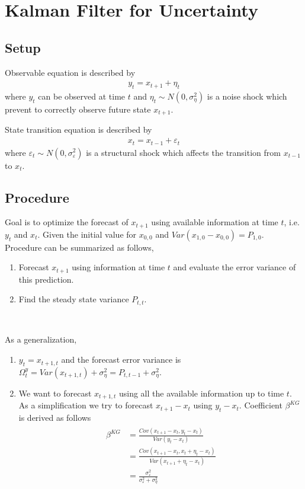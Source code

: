 \documentclass[14pt]{article}
\begin{document}
	
	\large{

\section*{Kalman Filter for Uncertainty}

\subsection*{Setup}

Observable equation is described by
\begin{eqnarray}
y_t = x_{t+1} + \eta_t
\end{eqnarray}
where $y_t$ can be observed at time $t$ and $\eta_t \sim N(0,\sigma^2_{\eta})$ is a noise shock which prevent to correctly observe future state $x_{t+1}$.


State transition equation is described by
\begin{eqnarray}
x_{t} = x_{t-1} + \varepsilon_t
\end{eqnarray}
where $\varepsilon_t \sim N(0,\sigma^2_{\varepsilon})$ is a structural shock which affects the transition from $x_{t-1}$ to $x_t$.

\subsection*{Procedure}

Goal is to optimize the forecast of $x_{t+1}$ using available information at time $t$, i.e. $y_t$ and $x_t$. Given the initial value for $x_{0,0}$ and $Var(x_{1,0} - x_{0,0}) = P_{1,0}$. Procedure can be summarized as follows,
\begin{enumerate}
	\item Forecast $x_{t+1}$ using information at time $t$ and evaluate the error variance of this prediction.
	\item Find the steady state variance $P_{t,t}$.
\end{enumerate}

\ 

As a generalization, 
\begin{enumerate}
	\item $y_{t} = x_{t+1,t}$ and the forecast error variance is $\Omega^y_{t} = Var(x_{t+1,t}) + \sigma^2_{\eta} = P_{t,t-1} + \sigma^2_{\eta}$.
	\item We want to forecast $x_{t+1,t}$ using all the available information up to time $t$. As a simplification we try to forecast $x_{t+1} -  x_{t}$ using $y_t -  x_{t}$.
	Coefficient $\beta^{KG}$ is derived as follows
	\begin{eqnarray}
	\begin{aligned}
	\beta^{KG} &= \frac{Cov(x_{t+1} -  x_{t}, y_t - x_{t})}{Var(y_t -  x_{t})}  \\
	             &= \frac{Cov(x_{t+1} - x_{t},  x_t + \eta_t -  x_{t})}{Var( x_{t+1} + \eta_t - x_{t})} \\
	             &= \frac{\sigma^2_{\varepsilon}}{\sigma^2_{\varepsilon} + \sigma^2_{\eta}} 
	\end{aligned}
	\end{eqnarray}
	

\end{enumerate}}
\end{document}

